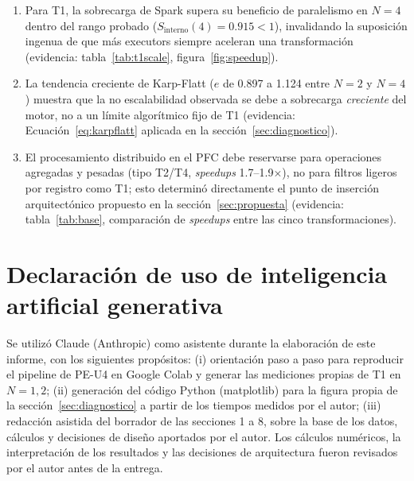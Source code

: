 \documentclass[11pt,a4paper]{article}
\begin{document}
\begin{enumerate}
  \item Para T1, la sobrecarga de Spark supera su beneficio de paralelismo en
    $N=4$ dentro del rango probado ($S_{\text{interno}}(4)=0.915<1$),
    invalidando la suposición ingenua de que más executors siempre aceleran una
    transformación (evidencia: tabla~\ref{tab:t1scale}, figura~\ref{fig:speedup}).
  \item La tendencia creciente de Karp-Flatt ($e$ de 0.897 a 1.124 entre $N=2$ y
    $N=4$) muestra que la no escalabilidad observada se debe a sobrecarga
    \emph{creciente} del motor, no a un límite algorítmico fijo de T1 (evidencia:
    Ecuación~\ref{eq:karpflatt} aplicada en la sección~\ref{sec:diagnostico}).
  \item El procesamiento distribuido en el PFC debe reservarse para operaciones
    agregadas y pesadas (tipo T2/T4, \textit{speedups} 1.7--1.9$\times$), no para
    filtros ligeros por registro como T1; esto determinó directamente el punto de
    inserción arquitectónico propuesto en la sección~\ref{sec:propuesta}
    (evidencia: tabla~\ref{tab:base}, comparación de \textit{speedups} entre las
    cinco transformaciones).
\end{enumerate}

\section{Declaración de uso de inteligencia artificial generativa}

Se utilizó Claude (Anthropic) como asistente durante la elaboración de este
informe, con los siguientes propósitos: (i) orientación paso a paso para
reproducir el pipeline de PE-U4 en Google Colab y generar las mediciones propias
de T1 en $N=1,2$; (ii) generación del código Python (matplotlib) para la figura
propia de la sección~\ref{sec:diagnostico} a partir de los tiempos medidos por el
autor; (iii) redacción asistida del borrador de las secciones 1 a 8, sobre la base
de los datos, cálculos y decisiones de diseño aportados por el autor. Los cálculos
numéricos, la interpretación de los resultados y las decisiones de arquitectura
fueron revisados por el autor antes de la entrega.

\printbibliography
\end{document}
